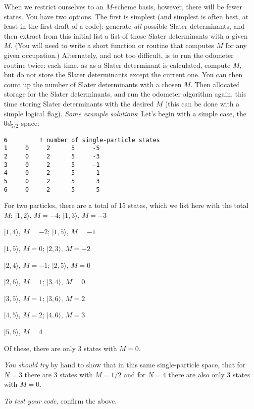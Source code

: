 When we restrict ourselves to an $M$-scheme basis, however, there will be fewer 
states.  You have two options. The first is simplest (and simplest is often best, at 
least in the first draft of a code): generate \textit{all} possible Slater determinants, 
and then extract from this initial list a list of those Slater determinants with a given 
$M$. (You will need to write a short function or routine that computes $M$ for any 
given occupation.)  
Alternately, and not too difficult, is to run the odometer routine twice: each time, as 
as a Slater determinant is calculated, compute $M$, but do not store the Slater determinants 
except the current one. You can then count up the number of Slater determinants with a 
chosen $M$.  Then allocated storage for the Slater determinants, and run the odometer 
algorithm again, this time storing Slater determinants with the desired $M$ (this can be 
done with a simple logical flag). 
\textit{Some example solutions}:  Let's begin with a simple case, the $0d_{5/2}$ space:
\begin{verbatim}
6         ! number of single-particle states
1     0     2      5     -5
2     0     2      5     -3
3     0     2      5     -1
4     0     2      5      1
5     0     2      5      3
6     0     2      5      5
\end{verbatim}
For two particles, there are a total of 15 states, which we list here with the total $M$:
\noindent $| 1,2 \rangle$, $M= -4$; 
 $| 1,3 \rangle$, $M= -3$

\noindent  $| 1,4 \rangle$, $M= -2$; 
 $| 1,5 \rangle$, $M= -1$

\noindent $| 1,5 \rangle$, $M= 0$; 
 $| 2,3 \rangle$, $M= -2$

\noindent $| 2,4 \rangle$, $M= -1$;
 $| 2,5 \rangle$, $M= 0$

\noindent $| 2,6 \rangle$, $M= 1$;
 $| 3,4 \rangle$, $M= 0$

\noindent $| 3,5 \rangle$, $M= 1$;
 $| 3,6 \rangle$, $M= 2$

\noindent $| 4,5 \rangle$, $M= 2$;
 $ | 4,6 \rangle$, $M= 3$

\noindent $| 5,6 \rangle$, $M= 4$

Of these, there are only 3 states with $M=0$. 

\textit{You should try} by hand to show that in this same single-particle space, that for 
$N=3$ there are 3 states with $M=1/2$ and for $N= 4$ there are also only 3 states with $M=0$. 

\textit{To test your code}, confirm the above. 


